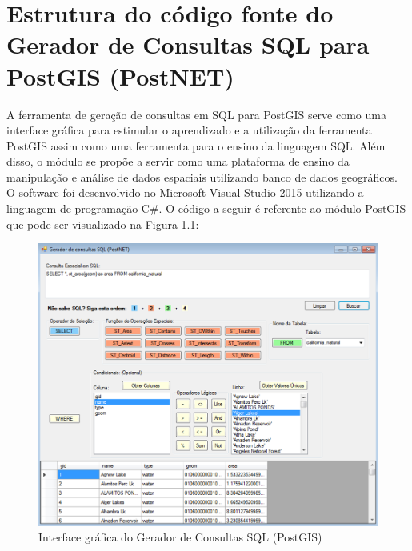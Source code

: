\chapter{Estrutura do código fonte do Gerador de Consultas SQL para PostGIS (PostNET)}

A ferramenta de geração de consultas em SQL para PostGIS serve como uma interface gráfica para estimular o aprendizado e a utilização da ferramenta PostGIS assim como uma ferramenta para o ensino da linguagem SQL. Além disso, o módulo se propõe a servir como uma plataforma de ensino da manipulação e análise de dados espaciais utilizando banco de dados geográficos. O software foi desenvolvido no Microsoft Visual Studio 2015 utilizando a linguagem de programação C\#. O código a seguir é referente ao módulo PostGIS que pode ser visualizado na Figura \ref{fig:postnetguiquery}:

	\begin{figure}
		\centering
		\includegraphics[width=1\linewidth]{data/postnet_gui_query}
		\caption{Interface gráfica do Gerador de Consultas SQL (PostGIS)}
		\label{fig:postnetguiquery}
	\end{figure}

\newpage
	
